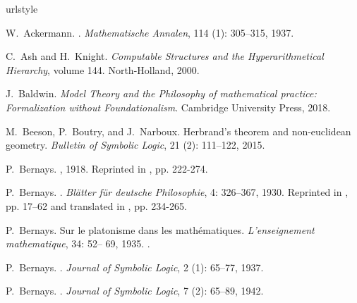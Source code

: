 \documentclass[11pt,fleqn,leqno]{article}
\begin{document}
\begin{thebibliography}{118}
\providecommand{\natexlab}[1]{#1}
\providecommand{\url}[1]{\texttt{#1}}
\expandafter\ifx\csname urlstyle\endcsname\relax
  \providecommand{\doi}[1]{doi: #1}\else
  \providecommand{\doi}{doi: \begingroup \urlstyle{rm}\Url}\fi

W.~Ackermann.
.
\newblock \emph{Mathematische Annalen}, 114 (1): 305--315,
  1937.

C.~Ash and H.~Knight.
\newblock \emph{Computable {S}tructures and the {H}yperarithmetical
  {H}ierarchy}, volume 144.
\newblock North-Holland, 2000.

J.~Baldwin.
\newblock \emph{Model Theory and the Philosophy of mathematical practice:
  Formalization without Foundationalism}.
\newblock Cambridge University Press, 2018.

M.~Beeson, P.~Boutry, and J.~Narboux.
\newblock Herbrand's theorem and non-euclidean geometry.
\newblock \emph{Bulletin of Symbolic Logic}, 21 (2):
  111--122, 2015.

P.~Bernays.
, 1918.
\newblock Reprinted in \citep{Hilbert2013}, pp. 222-274.

P.~Bernays.
.
\newblock \emph{{Bl\"{a}tter f\"{u}r deutsche Philosophie}}, 4:
  326--367, 1930.
\newblock Reprinted in \cite{Bernays1976}, pp. 17--62 and translated in
  \cite{Mancosu1998}, pp. 234-265.

P.~Bernays.
\newblock Sur le platonisme dans les math{\'e}matiques.
\newblock \emph{L'enseignement mathematique}, 34: 52-- 69, 1935.
.

P.~Bernays.
.
\newblock \emph{Journal of Symbolic Logic}, 2 (1): 65--77,
  1937.

P.~Bernays.
.
\newblock \emph{Journal of Symbolic Logic}, 7 (2): 65--89,
  1942.


\end{thebibliography}
\end{document}
